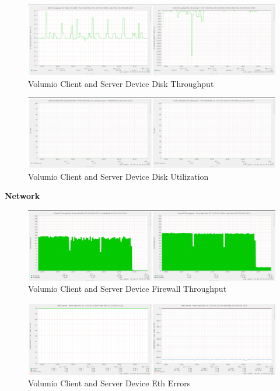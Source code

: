 \documentclass[11pt,a4paper,headinclude=false,footinclude=false]{scrreprt}
\begin{document}
\begin{figure}[H]
\includegraphics{ResultsAndAnalysis/VolumioServerTestImages/007VolumioDiskThroughput.png}
\centering
\caption{Volumio Client and Server Device Disk Throughput}
\label{VolumioDiskThroughput}
\end{figure}

\begin{figure}[H]
\includegraphics{ResultsAndAnalysis/VolumioServerTestImages/009VolumioDiskUtilization.png}
\centering
\caption{Volumio Client and Server Device Disk Utilization}
\label{VolumioDiskUtil}
\end{figure}

\textbf{Network}

\begin{figure}[H]
\includegraphics{ResultsAndAnalysis/VolumioServerTestImages/012VolumioFirewallThroughput.png}
\centering
\caption{Volumio Client and Server Device Firewall Throughput}
\label{VolumioFirewallThroughput}
\end{figure}

\begin{figure}[H]
\includegraphics{ResultsAndAnalysis/VolumioServerTestImages/010VolumioEth0Errors.png}
\centering
\caption{Volumio Client and Server Device Eth Errors}
\label{VolumioEthError}
\end{figure}
\end{document}
